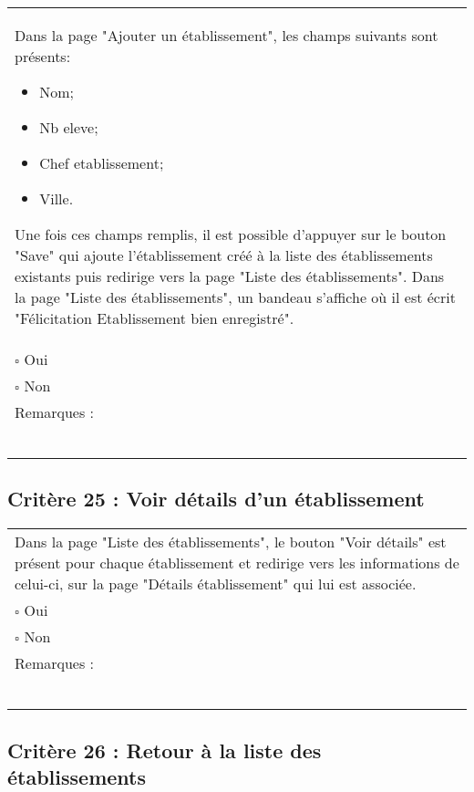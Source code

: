 	\begin{center}
    	 		\begin{tabular}[h]{|p{}|}
			\hline
				Dans la page "Ajouter un établissement", les champs suivants sont présents: 
				\begin{itemize}
					\item Nom;
					\item Nb eleve;
					\item Chef etablissement;
					\item Ville.
				\end{itemize}
				Une fois ces champs remplis, il est possible d'appuyer sur le bouton "Save" qui ajoute l'établissement créé à la liste des établissements existants puis redirige vers la page "Liste des établissements". Dans la page "Liste des établissements", un bandeau s'affiche où il est écrit "Félicitation Etablissement bien enregistré".\\
				$\square$ Oui  \\ $\square$ Non \\\hline Remarques : \\ ~\\
			 \\\hline
     		\end{tabular}
  		\end{center}	
  		
  		
  		\subsection*{Critère 25 : Voir détails d'un établissement}
	
	\begin{center}
    	 		\begin{tabular}[h]{|p{}|}
			\hline
				Dans la page "Liste des établissements", le bouton "Voir détails" est présent pour chaque établissement et redirige vers les informations de celui-ci, sur la page "Détails établissement" qui lui est associée.\\
				$\square$ Oui  \\ $\square$ Non \\\hline Remarques : \\ ~\\
			 \\\hline
     		\end{tabular}
  		\end{center}	
  		
  		
  		\subsection*{Critère 26 : Retour à la liste des établissements}
	
